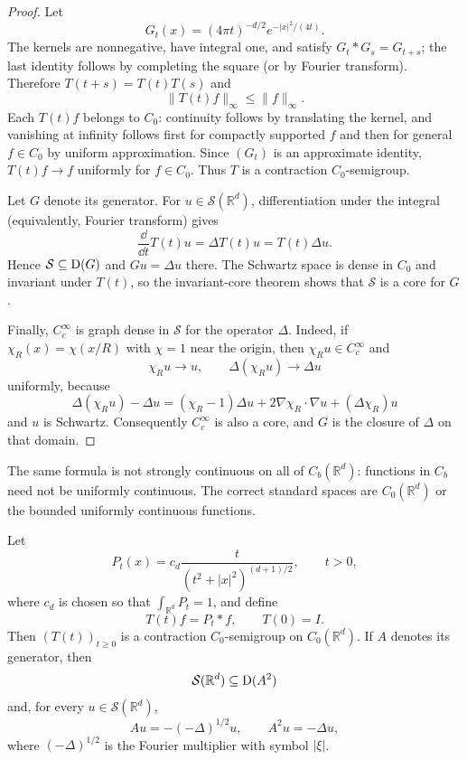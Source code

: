 \begin{proof}
Let
\[
  G_t(x)=(4\pi t)^{-d/2}e^{-|x|^2/(4t)}.
\]
The kernels are nonnegative, have integral one, and satisfy
$G_t*G_s=G_{t+s}$; the last identity follows by completing the square (or by
Fourier transform).  Therefore $T(t+s)=T(t)T(s)$ and
\[
  \|T(t)f\|_\infty\le\|f\|_\infty.
\]
Each $T(t)f$ belongs to $C_0$: continuity follows by translating the kernel,
and vanishing at infinity follows first for compactly supported $f$ and then
for general $f\in C_0$ by uniform approximation.  Since $(G_t)$ is an
approximate identity, $T(t)f\to f$ uniformly for $f\in C_0$.  Thus $T$ is a
contraction $C_0$-semigroup.

Let $G$ denote its generator.  For $u\in\mathcal S(\mathbb R^d)$,
differentiation under the integral (equivalently, Fourier transform) gives
\[
  \frac{\dd}{\dd t}T(t)u
  =\Delta T(t)u=T(t)\Delta u.
\]
Hence $\mathcal S\subseteq\operatorname{D}(G)$ and $Gu=\Delta u$ there.  The Schwartz
space is dense in $C_0$ and invariant under $T(t)$, so the invariant-core
theorem shows that $\mathcal S$ is a core for $G$.

Finally, $C_c^\infty$ is graph dense in $\mathcal S$ for the operator
$\Delta$.  Indeed, if $\chi_R(x)=\chi(x/R)$ with $\chi=1$ near the origin,
then $\chi_Ru\in C_c^\infty$ and
\[
  \chi_Ru\to u,
  \qquad
  \Delta(\chi_Ru)\to\Delta u
\]
uniformly, because
\[
  \Delta(\chi_Ru)-\Delta u
  =(\chi_R-1)\Delta u+2\nabla\chi_R\cdot\nabla u+(\Delta\chi_R)u
\]
and $u$ is Schwartz.  Consequently $C_c^\infty$ is also a core, and $G$ is
the closure of $\Delta$ on that domain.
\end{proof}

\begin{noteremark}
The same formula is not strongly continuous on all of $C_b(\mathbb R^d)$:
functions in $C_b$ need not be uniformly continuous.  The correct standard
spaces are $C_0(\mathbb R^d)$ or the bounded uniformly continuous functions.
\end{noteremark}

\begin{notetheorem}
Let
\[
  P_t(x)=c_d\frac{t}{(t^2+|x|^2)^{(d+1)/2}},
  \qquad t>0,
\]
where $c_d$ is chosen so that $\int_{\mathbb R^d}P_t=1$, and define
\[
  T(t)f=P_t*f,
  \qquad T(0)=I.
\]
Then $(T(t))_{t\ge0}$ is a contraction $C_0$-semigroup on
$C_0(\mathbb R^d)$.  If $A$ denotes its generator, then
\[
  \mathcal S(\mathbb R^d)\subseteq\operatorname{D}(A^2)
\]
and, for every $u\in\mathcal S(\mathbb R^d)$,
\[
  Au=-(-\Delta)^{1/2}u,
  \qquad
  A^2u=-\Delta u,
\]
where $(-\Delta)^{1/2}$ is the Fourier multiplier with symbol $|\xi|$.
\end{notetheorem}

